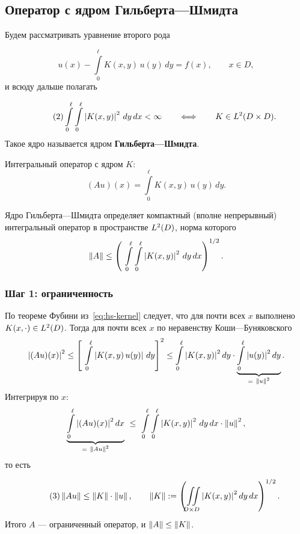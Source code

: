 \subsection{Оператор с ядром Гильберта—Шмидта}

Будем рассматривать уравнение второго рода

\begin{equation}\tag{1}\label{eq:hs-eq}
  u(x) - \int\limits_{0}^{\ell} K(x,y)\, u(y)\, dy = f(x), \qquad x \in D ,
\end{equation}
и всюду дальше полагать

\begin{equation}\tag{2}\label{eq:hs-kernel}
  \int\limits_{0}^{\ell}\int\limits_{0}^{\ell} \left\lvert K(x,y) \right\rvert^2\, dy\, dx < \infty
  \qquad\Longleftrightarrow\qquad
  K \in L^{2}(D \times D) .
\end{equation}
Такое ядро называется ядром \textbf{Гильберта—Шмидта}.

\begin{definition}
Интегральный оператор с ядром $K$:
\[
  (Au)(x) = \int\limits_{0}^{\ell} K(x,y)\, u(y)\, dy .
\]
\end{definition}

\begin{theorem}\label{thm:hs-compact}
Ядро Гильберта—Шмидта определяет компактный (вполне непрерывный)
интегральный оператор в пространстве $L^{2}(D)$, норма которого
\[
  \norm{A} \le \left(\ \int\limits_{0}^{\ell}\int\limits_{0}^{\ell}
  \abs{K(x,y)}^2\, dy\, dx \right)^{1/2} .
\]
\end{theorem}

\subsubsection*{Шаг 1: ограниченность}

По теореме Фубини из~\eqref{eq:hs-kernel} следует, что для почти всех $x$
выполнено $K(x,\cdot) \in L^{2}(D)$. Тогда для почти всех $x$ по неравенству
Коши—Буняковского
\[
  \abs{(Au)(x)}^2
  \le \left[\ \int\limits_{0}^{\ell} \abs{K(x,y)\, u(y)}\, dy \right]^2
  \le \int\limits_{0}^{\ell} \abs{K(x,y)}^2 dy \cdot
      \underbrace{\int\limits_{0}^{\ell} \abs{u(y)}^2 dy}_{=\ \norm{u}^2} .
\]
Интегрируя по $x$:
\[
  \underbrace{\int\limits_{0}^{\ell} \left\lvert (Au)(x) \right\rvert^2 dx}_{=\ \left\lVert Au \right\rVert^2}
  \ \le\ \int\limits_{0}^{\ell}\int\limits_{0}^{\ell} \left\lvert K(x,y) \right\rvert^2\, dy\, dx
  \cdot \left\lVert u \right\rVert^2 ,
\]
то есть

\begin{equation}\tag{3}\label{eq:hs-bound}
  \left\lVert Au \right\rVert \le \left\lVert K \right\rVert\cdot\left\lVert u \right\rVert ,
  \qquad
  \left\lVert K \right\rVert := \left(\iint\limits_{D\times D}\left\lvert K(x,y) \right\rvert^2 dy\,dx\right)^{1/2} .
\end{equation}
Итого $A$ — ограниченный оператор, и $\left\lVert A \right\rVert \le \left\lVert K \right\rVert$.


